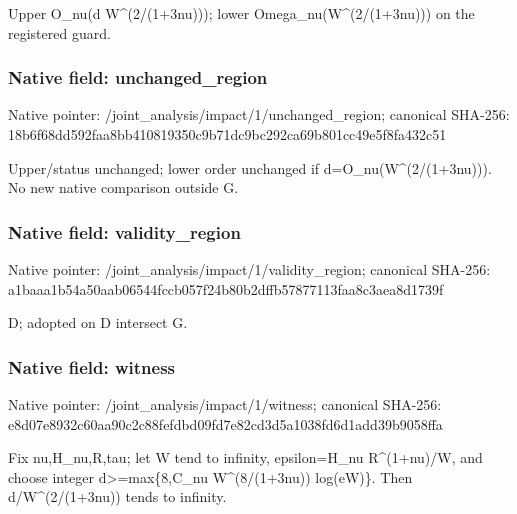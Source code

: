 \documentclass[10pt,a4paper]{article}
\begin{document}
\begingroup\raggedright\sloppy Upper O\_\allowbreak{}nu(d W\textasciicircum{}(2/\allowbreak{}(1+3nu)));\allowbreak{} lower Omega\_\allowbreak{}nu(W\textasciicircum{}(2/\allowbreak{}(1+3nu))) on the registered guard.\par\endgroup

\subsubsection{Native field: unchanged\_\allowbreak{}region}
Native pointer: /joint\_\allowbreak{}analysis/impact/1/unchanged\_\allowbreak{}region; canonical SHA-256: 18b6f68dd592faa8bb410819350c9b71dc9bc292ca69b801cc49e5f8fa432c51

\begingroup\raggedright\sloppy Upper/\allowbreak{}status unchanged;\allowbreak{} lower order unchanged if d=\allowbreak{}O\_\allowbreak{}nu(W\textasciicircum{}(2/\allowbreak{}(1+3nu))). No new native comparison outside G.\par\endgroup

\subsubsection{Native field: validity\_\allowbreak{}region}
Native pointer: /joint\_\allowbreak{}analysis/impact/1/validity\_\allowbreak{}region; canonical SHA-256: a1baaa1b54a50aab06544fccb057f24b80b2dffb57877113faa8c3aea8d1739f

\begingroup\raggedright\sloppy D;\allowbreak{} adopted on D intersect G.\par\endgroup

\subsubsection{Native field: witness}
Native pointer: /joint\_\allowbreak{}analysis/impact/1/witness; canonical SHA-256: e8d07e8932c60aa90c2c88fefdbd09fd7e82cd3d5a1038fd6d1add39b9058ffa

\begingroup\raggedright\sloppy Fix nu,\allowbreak{}H\_\allowbreak{}nu,\allowbreak{}R,\allowbreak{}tau;\allowbreak{} let W tend to infinity,\allowbreak{} epsilon=\allowbreak{}H\_\allowbreak{}nu R\textasciicircum{}(1+nu)/\allowbreak{}W,\allowbreak{} and choose integer d>=\allowbreak{}max\{8,\allowbreak{}C\_\allowbreak{}nu W\textasciicircum{}(8/\allowbreak{}(1+3nu)) log(eW)\}. Then d/\allowbreak{}W\textasciicircum{}(2/\allowbreak{}(1+3nu)) tends to infinity.\par\endgroup
\end{document}
